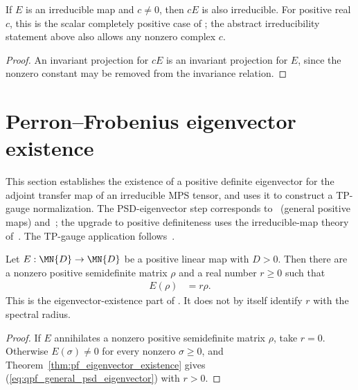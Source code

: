 \begin{theorem}%
    \label{thm:irred_map_smul}
    \leanok
    If $E$ is an irreducible map and $c \neq 0$, then $cE$
    is also irreducible.
    For positive real $c$, this is the scalar completely positive case of
    \cite[Proposition~6.6]{Wolf2012Quantum}; the abstract irreducibility
    statement above also allows any nonzero complex $c$.
\end{theorem}

\begin{proof}\leanok
    An invariant projection for $cE$ is an invariant projection
    for $E$, since the nonzero constant may be removed from the invariance
    relation.
\end{proof}

\section{Perron--Frobenius eigenvector existence}%
\label{sec:pf_eigenvector}

This section establishes the existence of a positive definite
eigenvector for the adjoint transfer map of an irreducible MPS
tensor, and uses it to construct a TP-gauge normalization.
The PSD-eigenvector step corresponds to~\cite[Theorem~6.5]{Wolf2012Quantum}
(general positive maps) and~\cite{Evans1978Spectral}; the upgrade to positive
definiteness uses the irreducible-map theory of~\cite[Theorem~6.3]{Wolf2012Quantum}.
The TP-gauge application follows~\cite[Appendix~A]{Cirac2016MPDO_arXiv}.

\begin{theorem}
    \label{thm:pf_eigenvector_existence_general}
    \leanok
    Let $E:\MN{D}\to\MN{D}$ be a positive linear map with $D>0$. Then
    there are a nonzero positive semidefinite matrix $\rho$ and a real number
    $r\geq0$ such that
    \begin{align}
        E(\rho)
         & =r\rho.
        \label{eq:qpf_general_psd_eigenvector}
    \end{align}
    This is the eigenvector-existence part of
    \cite[Theorem~6.5]{Wolf2012Quantum}. It does not by itself identify $r$
    with the spectral radius.
\end{theorem}

\begin{proof}\leanok
    If $E$ annihilates a nonzero positive semidefinite matrix $\rho$, take
    $r=0$. Otherwise $E(\sigma)\neq0$ for every nonzero
    $\sigma\geq0$, and Theorem~\ref{thm:pf_eigenvector_existence} gives
    (\ref{eq:qpf_general_psd_eigenvector}) with $r>0$.
\end{proof}

